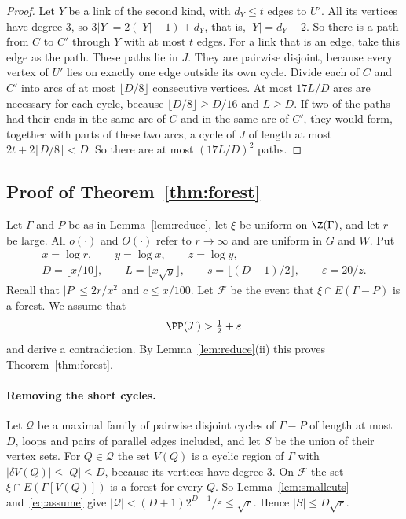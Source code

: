 \begin{proof}
Let $Y$ be a link of the second kind, with $d_Y\le t$ edges to $U'$. All its vertices have degree
$3$, so $3|Y|=2(|Y|-1)+d_Y$, that is, $|Y|=d_Y-2$. So there is a path from $C$ to $C'$ through $Y$
with at most $t$ edges. For a link that is an edge, take this edge as the path. These paths lie
in $J$. They are pairwise disjoint, because every vertex of $U'$ lies on exactly one edge outside
its own cycle. Divide each of $C$ and $C'$ into arcs of at most $\lfloor D/8\rfloor$ consecutive
vertices. At most $17L/D$ arcs are necessary for each cycle, because $\lfloor D/8\rfloor\ge D/16$
and $L\ge D$. If two of the paths had their ends in the same arc of $C$ and in the same arc of
$C'$, they would form, together with parts of these two arcs, a cycle of $J$ of length at most
$2t+2\lfloor D/8\rfloor<D$. So there are at most $(17L/D)^{2}$ paths.
\end{proof}

\subsection{Proof of Theorem~\ref{thm:forest}}

Let $\Gamma$ and $P$ be as in Lemma~\ref{lem:reduce}, let $\xi$ be uniform on $\Z(\Gamma)$, and let
$r$ be large. All $o(\cdot)$ and $O(\cdot)$ refer to $r\to\infty$ and are uniform in $G$ and $W$.
Put
\begin{gather*}
  x=\log r,\qquad y=\log x,\qquad z=\log y,\\
  D=\lfloor x/10\rfloor,\qquad L=\lfloor x\sqrt y\rfloor,\qquad
  s=\lfloor(D-1)/2\rfloor,\qquad\varepsilon=20/z .
\end{gather*}
Recall that $|P|\le2r/x^{2}$ and $c\le x/100$. Let $\mathcal{F}$ be the event that
$\xi\cap E(\Gamma-P)$ is a forest. We assume that
\begin{equation}\label{eq:assume}
  \PP(\mathcal{F})>\tfrac12+\varepsilon
\end{equation}
and derive a contradiction. By Lemma~\ref{lem:reduce}(ii) this proves Theorem~\ref{thm:forest}.

\paragraph{Removing the short cycles.}
Let $\mathcal{Q}$ be a maximal family of pairwise disjoint cycles of $\Gamma-P$ of length at most
$D$, loops and pairs of parallel edges included, and let $S$ be the union of their vertex sets. For
$Q\in\mathcal{Q}$ the set $V(Q)$ is a cyclic region of $\Gamma$ with $|\delta V(Q)|\le|Q|\le D$,
because its vertices have degree $3$. On $\mathcal{F}$ the set $\xi\cap E(\Gamma[V(Q)])$ is a forest
for every $Q$. So Lemma~\ref{lem:smallcuts} and~\eqref{eq:assume} give
$|\mathcal{Q}|<(D+1)2^{D-1}/\varepsilon\le\sqrt r$. Hence $|S|\le D\sqrt r$.

